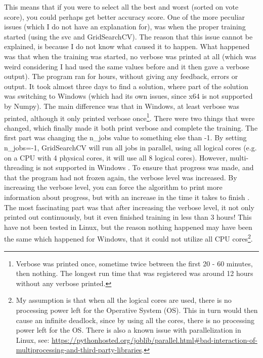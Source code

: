 This means that if you were to select all the best and worst (sorted on vote score), you could perhaps get better accuracy score.
\vspace{0.5em}\newline
One of the more peculiar issues (which I do not have an explanation for), was when the proper training started (using the \gls{svc} and GridSearchCV).
The reason that this issue cannot be explained, is because I do not know what caused it to happen.
What happened was that when the training was started, no verbose was printed at all (which was weird considering I had used the same values before and it then gave a verbose output). 
The program ran for hours, without giving any feedback, errors or output. 
\vspace{0.5em}\newline
It took almost three days to find a solution, where part of the solution was switching to Windows (which had its own issues, since x64 is not supported by Numpy).
The main difference was that in Windows, at least verbose was printed, although it only printed verbose once\footnote{
	Verbose was printed once, sometime twice between the first 20 - 60 minutes, then nothing.
	The longest run time that was registered was around 12 hours without any verbose printed.
}.
There were two things that were changed, which finally made it both print verbose and complete the training.
The first part was changing the n\_jobs value to something else than -1. 
By setting n\_jobs=-1, GridSearchCV will run all jobs in parallel, using all logical cores (e.g. on a CPU with 4 physical cores, it will use all 8 logical cores). 
However, multi-threading is not supported in Windows \cite{GS2015}. 
To ensure that progress was made, and that the program had not frozen again, the verbose level was increased.
By increasing the verbose level, you can force the algorithm to print more information about progress, but with an increase in the time it takes to finish \cite{Manuel2015, user29912432014}. 
The most fascinating part was that after increasing the verbose level, it not only printed out continuously, but it even finished training in less than 3 hours!
This have not been tested in Linux, but the reason nothing happened may have been the same which happened for Windows, that it could not utilize all CPU cores\footnote{
	My assumption is that when all the logical cores are used, there is no processing power left for the Operative System (OS). 
	This in turn would then cause an infinite deadlock, since by using all the cores, there is no processing power left for the OS.
	There is also a known issue with parallelization in Linux, see: 
	\url{https://pythonhosted.org/joblib/parallel.html\#bad-interaction-of-multiprocessing-and-third-party-libraries}.
}.
